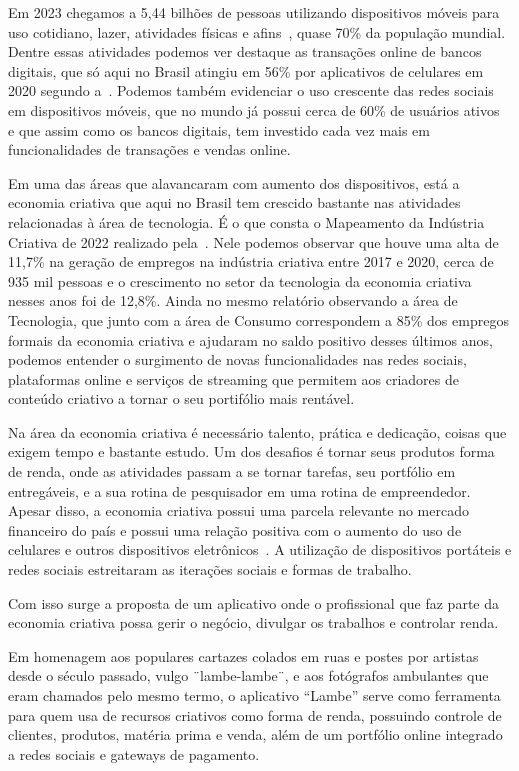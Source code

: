 Em 2023 chegamos a 5,44 bilhões de pessoas utilizando dispositivos móveis para uso cotidiano, lazer, atividades físicas e afins~\cite{wearesocial}, quase 70\% da população mundial.
Dentre essas atividades podemos ver destaque as transações online de bancos digitais, que só aqui no Brasil atingiu em 56\% por aplicativos de celulares em 2020 segundo a~.
Podemos também evidenciar o uso crescente das redes sociais em dispositivos móveis, que no mundo já possui cerca de 60\% de usuários ativos~\cite{wearesocial} e que assim como os bancos digitais, tem investido cada vez mais em funcionalidades de transações e vendas online.

Em uma das áreas que alavancaram com aumento dos dispositivos, está a economia criativa que aqui no Brasil tem crescido bastante nas atividades relacionadas à área de tecnologia.
É o que consta o Mapeamento da Indústria Criativa de 2022 realizado pela~.
Nele podemos observar que houve uma alta de 11,7\% na geração de empregos na indústria criativa entre 2017 e 2020, cerca de 935 mil pessoas e o crescimento no setor da tecnologia da economia criativa nesses anos foi de 12,8\%.
Ainda no mesmo relatório observando a área de Tecnologia, que junto com a área de Consumo correspondem a 85\% dos empregos formais da economia criativa e ajudaram no saldo positivo desses últimos anos, podemos entender o surgimento de novas funcionalidades nas redes sociais, plataformas online e serviços de streaming que permitem aos criadores de conteúdo criativo a tornar o seu portifólio mais rentável.

Na área da economia criativa é necessário talento, prática e dedicação, coisas que exigem tempo e bastante estudo.
Um dos desafios é tornar seus produtos forma de renda, onde as atividades passam a se tornar tarefas, seu portfólio em entregáveis, e a sua rotina de pesquisador em uma rotina de empreendedor.
Apesar disso, a economia criativa possui uma parcela relevante no mercado financeiro do país e possui uma relação positiva com o aumento do uso de celulares e outros dispositivos eletrônicos~.
A utilização de dispositivos portáteis e redes sociais estreitaram as iterações sociais e formas de trabalho.

Com isso surge a proposta de um aplicativo onde o profissional que faz parte da economia criativa possa gerir o negócio, divulgar os trabalhos e controlar renda.

Em homenagem aos populares cartazes colados em ruas e postes por artistas desde o século passado, vulgo ¨lambe-lambe¨, e aos fotógrafos ambulantes que eram chamados pelo mesmo termo, o aplicativo “Lambe” serve como ferramenta para quem usa de recursos criativos como forma de renda, possuindo controle de clientes, produtos, matéria prima e venda, além de um portfólio online integrado a redes sociais e gateways de pagamento.

